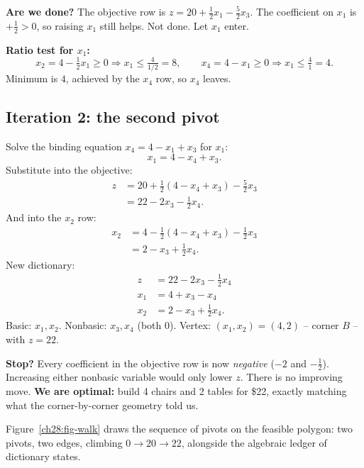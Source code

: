 \textbf{Are we done?} The objective row is $z = 20 + \tfrac12 x_1 - \tfrac52
x_3$. The coefficient on $x_1$ is $+\tfrac12 > 0$, so raising $x_1$ still helps.
Not done. Let $x_1$ enter.

\textbf{Ratio test for $x_1$:}
\[
x_2 = 4 - \tfrac12 x_1 \ge 0 \Rightarrow x_1 \le \tfrac{4}{1/2}=8,\qquad
x_4 = 4 - x_1 \ge 0 \Rightarrow x_1 \le \tfrac{4}{1}=4 .
\]
Minimum is $4$, achieved by the $x_4$ row, so $x_4$ leaves.

\subsection{Iteration 2: the second pivot}

Solve the binding equation $x_4 = 4 - x_1 + x_3$ for $x_1$:
\[
x_1 = 4 - x_4 + x_3 .
\]
Substitute into the objective:
\begin{align*}
z &= 20 + \tfrac12(4 - x_4 + x_3) - \tfrac52 x_3 \\
  &= 22 - 2 x_3 - \tfrac12 x_4 .
\end{align*}
And into the $x_2$ row:
\begin{align*}
x_2 &= 4 - \tfrac12(4 - x_4 + x_3) - \tfrac12 x_3 \\
    &= 2 - x_3 + \tfrac12 x_4 .
\end{align*}
New dictionary:
\[
\begin{aligned}
z   &= 22 - 2x_3 - \tfrac12 x_4 \\
x_1 &= 4 + x_3 - x_4 \\
x_2 &= 2 - x_3 + \tfrac12 x_4 .
\end{aligned}
\]
Basic: $x_1, x_2$. Nonbasic: $x_3, x_4$ (both 0). Vertex:
$(x_1,x_2) = (4,2)$ -- corner $B$ -- with $z = 22$.

\textbf{Stop?} Every coefficient in the objective row is now \emph{negative}
($-2$ and $-\tfrac12$). Increasing either nonbasic variable would only lower
$z$. There is no improving move. \textbf{We are optimal:} build 4 chairs and 2
tables for \$22, exactly matching what the corner-by-corner geometry told us.

Figure~\ref{ch28:fig-walk} draws the sequence of pivots on the feasible polygon:
two pivots, two edges, climbing $0 \to 20 \to 22$, alongside the algebraic ledger
of dictionary states.

